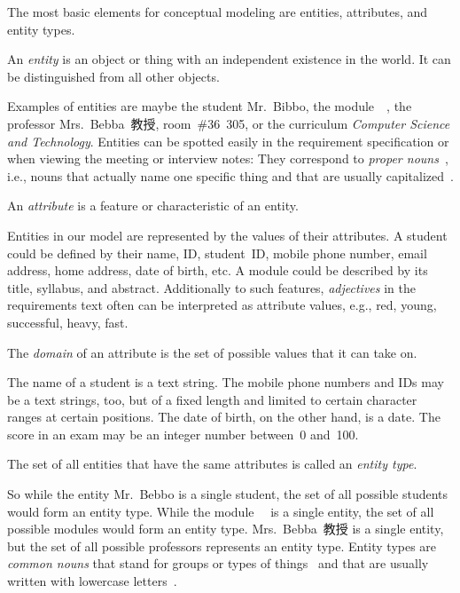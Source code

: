 %
%
%
The most basic elements for conceptual modeling are entities, attributes, and entity types.%
%
\begin{definition}[Entity]%
An \emph{entity} is an object or thing with an independent existence in the world. %
It can be distinguished from all other objects.%
\end{definition}%
%
Examples of entities are maybe the student Mr.~Bibbo, the module~~\cite{programmingWithPython}, the professor Mrs.~Bebba~教授, room~\#36~305, or the curriculum \emph{Computer Science and Technology}.
Entities can be spotted easily in the requirement specification or when viewing the meeting or interview notes:
They correspond to \emph{proper nouns}~\cite{S2024D:CDMERDE}, i.e., nouns that actually name one specific thing and that are usually capitalized~\cite{EOWM2025MWAMTD:CAPNWTDLWOGC}.%
%
\begin{definition}[Attribute]%
An \emph{attribute} is a feature or characteristic of an entity.%
\end{definition}%
%
Entities in our model are represented by the values of their attributes.
A student could be defined by their name, ID, student~ID, mobile phone number, email address, home address, date of birth, etc.
A module could be described by its title, syllabus, and abstract.
Additionally to such features, \emph{adjectives} in the requirements text often can be interpreted as attribute values, e.g., red, young, successful, heavy, fast.%
%
\begin{definition}[Domain]%
The \emph{domain} of an attribute is the set of possible values that it can take on.%
\end{definition}%
%
The name of a student is a text string.
The mobile phone numbers and IDs may be a text strings, too, but of a fixed length and limited to certain character ranges at certain positions.
The date of birth, on the other hand, is a date.
The score in an exam may be an integer number between~0 and~100.%
%
\begin{definition}%
\label{def:entityType}%
The set of all entities that have the same attributes is called an \emph{entity type}.%
\end{definition}%
%
So while the entity Mr.~Bebbo is a single student, the set of all possible students would form an entity type.
While the module~~\cite{programmingWithPython} is a single entity, the set of all possible modules would form an entity type.
Mrs.~Bebba~教授 is a single entity, but the set of all possible professors represents an entity type.
Entity types are \emph{common nouns} that stand for groups or types of things~\cite{S2024D:CDMERDE} and that are usually written with lowercase letters~\cite{EOWM2025MWAMTD:CAPNWTDLWOGC}.

